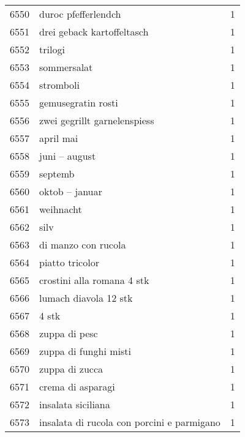 \begin{tabular}{llr}
6550 &                                duroc pfefferlendch &      1 \\
6551 &                         drei geback kartoffeltasch &      1 \\
6552 &                                            trilogi &      1 \\
6553 &                                        sommersalat &      1 \\
6554 &                                          stromboli &      1 \\
6555 &                                 gemusegratin rosti &      1 \\
6556 &                       zwei gegrillt garnelenspiess &      1 \\
6557 &                                          april mai &      1 \\
6558 &                                      juni – august &      1 \\
6559 &                                            septemb &      1 \\
6560 &                                     oktob – januar &      1 \\
6561 &                                          weihnacht &      1 \\
6562 &                                               silv &      1 \\
6563 &                                di manzo con rucola &      1 \\
6564 &                                    piatto tricolor &      1 \\
6565 &                         crostini alla romana 4 stk &      1 \\
6566 &                              lumach diavola 12 stk &      1 \\
6567 &                                              4 stk &      1 \\
6568 &                                      zuppa di pesc &      1 \\
6569 &                              zuppa di funghi misti &      1 \\
6570 &                                     zuppa di zucca &      1 \\
6571 &                                  crema di asparagi &      1 \\
6572 &                                 insalata siciliana &      1 \\
6573 &         insalata di rucola con porcini e parmigano &      1 \\

\end{tabular}

